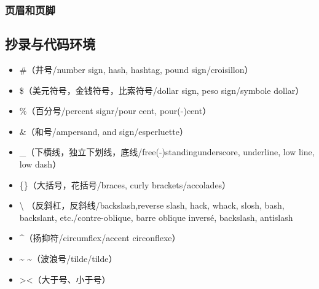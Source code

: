 \documentclass{ctexart}
\begin{document}
        \subsubsection{页眉和页脚}

    \subsection{抄录与代码环境}
            \begin{itemize}
                \item \#（井号/number sign, hash, hashtag, pound sign/croisillon）
                \item \$（美元符号，金钱符号，比索符号/dollar sign, peso sign/symbole dollar）
                \item \%（百分号/percent signr/pour cent, pour(-)cent）
                \item \&（和号/ampersand, and sign/esperluette）
                \item \_（下横线，独立下划线，底线/free(-)standingunderscore, underline, low line, low dash）
                \item \{\}（大括号，花括号/braces, curly brackets/accolades）
                \item \textbackslash \textrm{} {\rmfamily {}}（反斜杠，反斜线/backslash,reverse slash, hack, whack, slosh, bash, backslant, etc./contre-oblique, barre oblique inversé, backslash, antislash
                \item \^{}（扬抑符/circumflex/accent circonflexe）
                \item \~{} \textasciitilde（波浪号/tilde/tilde）
                \item \textgreater \textless（大于号、小于号）
            \end{itemize}
        
\end{document}
